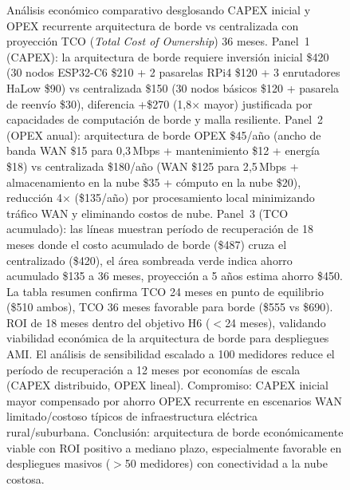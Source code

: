 \begin{figure}[H]
\caption{Análisis económico comparativo desglosando CAPEX inicial y OPEX recurrente arquitectura de borde vs centralizada con proyección TCO (\textit{Total Cost of Ownership}) 36 meses. Panel~1 (CAPEX): la arquitectura de borde requiere inversión inicial \$420 (30 nodos ESP32-C6 \$210 + 2 pasarelas RPi4 \$120 + 3 enrutadores HaLow \$90) vs centralizada \$150 (30 nodos básicos \$120 + pasarela de reenvío \$30), diferencia +\$270 (1{,}8$\times$ mayor) justificada por capacidades de computación de borde y malla resiliente. Panel~2 (OPEX anual): arquitectura de borde OPEX \$45/año (ancho de banda WAN \$15 para 0{,}3\,Mbps + mantenimiento \$12 + energía \$18) vs centralizada \$180/año (WAN \$125 para 2{,}5\,Mbps + almacenamiento en la nube \$35 + cómputo en la nube \$20), reducción 4$\times$ (\textminus\$135/año) por procesamiento local minimizando tráfico WAN y eliminando costos de nube. Panel~3 (TCO acumulado): las líneas muestran período de recuperación de 18 meses donde el costo acumulado de borde (\$487) cruza el centralizado (\$420), el área sombreada verde indica ahorro acumulado \$135 a 36 meses, proyección a 5 años estima ahorro \$450. La tabla resumen confirma TCO 24 meses en punto de equilibrio (\$510 ambos), TCO 36 meses favorable para borde (\$555 vs \$690). ROI de 18 meses dentro del objetivo H6 ($<$24 meses), validando viabilidad económica de la arquitectura de borde para despliegues AMI. El análisis de sensibilidad escalado a 100 medidores reduce el período de recuperación a 12 meses por economías de escala (CAPEX distribuido, OPEX lineal). Compromiso: CAPEX inicial mayor compensado por ahorro OPEX recurrente en escenarios WAN limitado/costoso típicos de infraestructura eléctrica rural/suburbana. Conclusión: arquitectura de borde económicamente viable con ROI positivo a mediano plazo, especialmente favorable en despliegues masivos ($>$50 medidores) con conectividad a la nube costosa.}
\label{fig:cost-breakdown}
\end{figure}

